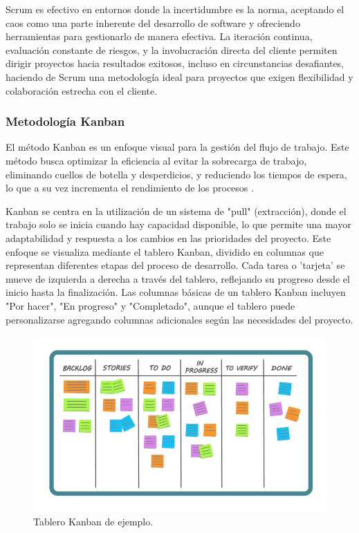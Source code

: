 \documentclass[main.tex]{subfiles}
\begin{document}
Scrum es efectivo en entornos donde la incertidumbre es la norma, aceptando el caos como una parte inherente del desarrollo de software y ofreciendo herramientas para gestionarlo de manera efectiva. La iteración continua, evaluación constante de riesgos, y la involucración directa del cliente permiten dirigir proyectos hacia resultados exitosos, incluso en circunstancias desafiantes, haciendo de Scrum una metodología ideal para proyectos que exigen flexibilidad y colaboración estrecha con el cliente.

\subsubsection{Metodología Kanban}

El método Kanban es un enfoque visual para la gestión del flujo de trabajo. Este método busca optimizar la eficiencia al evitar la sobrecarga de trabajo, eliminando cuellos de botella y desperdicios, y reduciendo los tiempos de espera, lo que a su vez incrementa el rendimiento de los procesos \cite{alaidaros2021kanban}.

Kanban se centra en la utilización de un sistema de "pull" (extracción), donde el trabajo solo se inicia cuando hay capacidad disponible, lo que permite una mayor adaptabilidad y respuesta a los cambios en las prioridades del proyecto. Este enfoque se visualiza mediante el tablero Kanban, dividido en columnas que representan diferentes etapas del proceso de desarrollo. Cada tarea o 'tarjeta' se mueve de izquierda a derecha a través del tablero, reflejando su progreso desde el inicio hasta la finalización. Las columnas básicas de un tablero Kanban incluyen "Por hacer", "En progreso" y "Completado", aunque el tablero puede personalizarse agregando columnas adicionales según las necesidades del proyecto.

\begin{figure}[h]
	\centering
	\includegraphics[width=\linewidth]{../assets/model-kanban.png}
	\caption{Tablero Kanban de ejemplo.}
\end{figure}
\end{document}
